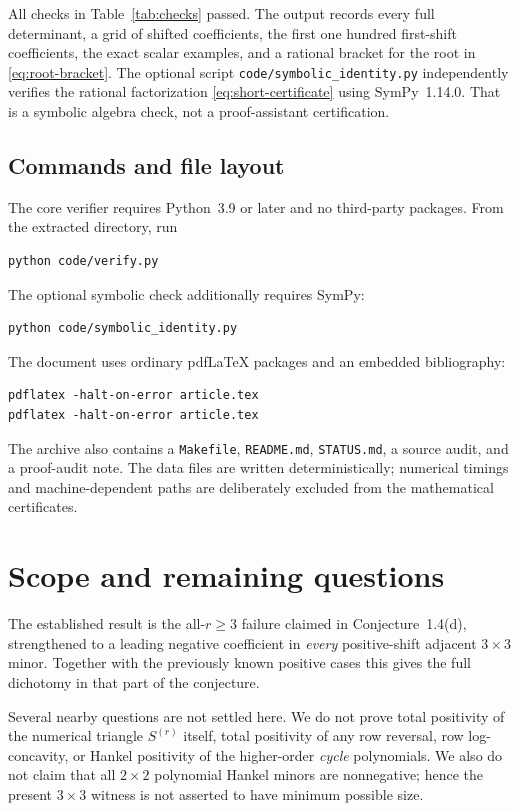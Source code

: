 \documentclass[11pt,a4paper]{article}
\theoremstyle{definition}
\numberwithin{equation}{section}
\begin{document}
All checks in Table~\ref{tab:checks} passed. The output records every full
determinant, a grid of shifted coefficients, the first one hundred
first-shift coefficients, the exact scalar examples, and a rational
bracket for the root in \eqref{eq:root-bracket}. The optional script
\texttt{code/symbolic\_identity.py} independently verifies the rational
factorization \eqref{eq:short-certificate} using SymPy~1.14.0. That is a
symbolic algebra check, not a proof-assistant certification.

\subsection{Commands and file layout}

The core verifier requires Python~3.9 or later and no third-party
packages. From the extracted directory, run
\begin{lstlisting}
python code/verify.py
\end{lstlisting}
The optional symbolic check additionally requires SymPy:
\begin{lstlisting}
python code/symbolic_identity.py
\end{lstlisting}
The document uses ordinary pdfLaTeX packages and an embedded bibliography:
\begin{lstlisting}
pdflatex -halt-on-error article.tex
pdflatex -halt-on-error article.tex
\end{lstlisting}
The archive also contains a \texttt{Makefile}, \texttt{README.md},
\texttt{STATUS.md}, a source audit, and a proof-audit note. The data files
are written deterministically; numerical timings and machine-dependent
paths are deliberately excluded from the mathematical certificates.

\section{Scope and remaining questions}
\label{sec:scope}

The established result is the all-$r\ge3$ failure claimed in
Conjecture~1.4(d), strengthened to a leading negative coefficient in
\emph{every} positive-shift adjacent $3\times3$ minor. Together with the
previously known positive cases this gives the full dichotomy in that
part of the conjecture.

Several nearby questions are not settled here. We do not prove total
positivity of the numerical triangle $S^{(r)}$ itself, total positivity
of any row reversal, row log-concavity, or Hankel positivity of the
higher-order \emph{cycle} polynomials. We also do not claim that all
$2\times2$ polynomial Hankel minors are nonnegative; hence the present
$3\times3$ witness is not asserted to have minimum possible size.
\end{document}
